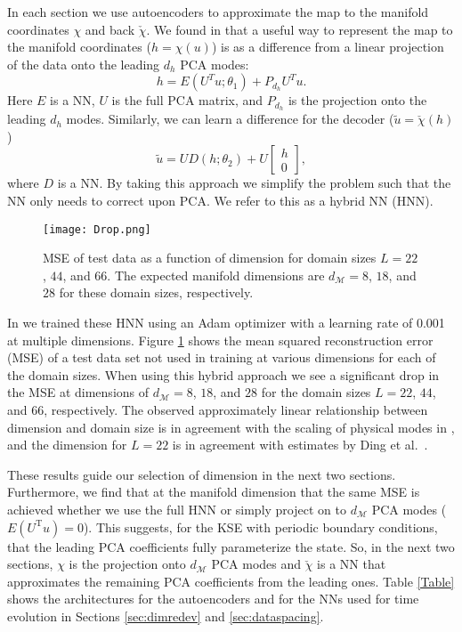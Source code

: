 \documentclass[preprint,aps,pre,letterpaper,onecolumn,superscriptaddress]{revtex4-2} %
\newcommand{\IM}{\mathcal{M}}
\newcommand{\trans}{^\mathrm{T}}
\begin{document}
In each section we use autoencoders to approximate the map to the manifold coordinates $\chi$ and back $\check{\chi}$. We found in \cite{Linot2020} that a useful way to represent the map to the manifold coordinates ($h=\chi(u)$) is as a difference from a linear projection of the data onto the leading $d_h$ PCA modes:
	\begin{equation} \label{eq:hidden}
		h=E(U^T u;\theta_1)+P_{d_h}U^T u.
	\end{equation}
Here $E$ is a NN, $U$ is the full PCA matrix, and $P_{d_h}$ is the projection onto the leading $d_h$ modes. Similarly, we can learn a difference for the decoder ($\tilde{u}=\check{\chi}(h)$)
\begin{equation} \label{eq:Autoencoder}
	\tilde{u}=UD(h;\theta_2)+U\begin{bmatrix}
		{h} \\ 0
	\end{bmatrix},
\end{equation}
where $D$ is a NN.
By taking this approach we simplify the problem such that the NN only needs to correct upon PCA. We refer to this as a hybrid NN (HNN). 

\begin{figure} 
	\texttt{[image: Drop.png]}
	\caption{MSE of test data as a function of dimension for domain sizes $L=22$, $44$, and $66$. The expected manifold dimensions are $d_\IM=8$, $18$, and $28$ for these domain sizes, respectively.}
	\label{fig:Dimension}
\end{figure} 

In \cite{Linot2020} we trained these HNN using an Adam optimizer with a learning rate of 0.001 at multiple dimensions. Figure \ref{fig:Dimension} shows the mean squared reconstruction error (MSE) of a test data set not used in training at various dimensions for each of the domain sizes. When using this hybrid approach we see a significant drop in the MSE at dimensions of $d_\mathcal{M}=8$, $18$, and $28$ for the domain sizes $L=22$, $44$, and $66$, respectively. The observed approximately linear relationship between dimension and domain size is in agreement with the scaling of physical modes in \cite{Yang2009}, and the dimension for $L=22$ is in agreement with estimates by Ding et al.\ \cite{Ding2016}.

These results guide our selection of dimension in the next two sections. Furthermore, we find that at the manifold dimension that the same MSE is achieved whether we use the full HNN or simply project on to $d_\IM$ PCA modes ($E(U\trans u)=0$). This suggests, for the KSE with periodic boundary conditions, that the leading PCA coefficients fully parameterize the state. So, in the next two sections, $\chi$ is the projection onto $d_\IM$ PCA modes and $\check{\chi}$ is a NN that approximates the remaining PCA coefficients from the leading ones. Table \ref{Table} shows the architectures for the autoencoders and for the NNs used for time evolution in Sections \ref{sec:dimredev} and \ref{sec:dataspacing}.
\end{document}
